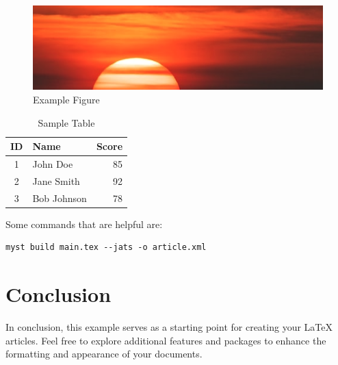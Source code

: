 \documentclass{article}
\begin{document}
\begin{figure}[h]
  \centering
  \includegraphics[width=0.8\linewidth]{image.png}
  \caption{Example Figure}
  \label{fig:example}
\end{figure}


\begin{table}[h]
  \centering
  \caption{Sample Table}
  \label{tab:sample}
  \begin{tabular}{|c|l|r|}
    \hline
    \textbf{ID} & \textbf{Name} & \textbf{Score} \\
    \hline
    1 & John Doe & 85 \\
    2 & Jane Smith & 92 \\
    3 & Bob Johnson & 78 \\
    \hline
  \end{tabular}
\end{table}

Some commands that are helpful are:

\begin{verbatim}
myst build main.tex --jats -o article.xml
\end{verbatim}

\section{Conclusion}
In conclusion, this example serves as a starting point for creating your LaTeX articles. Feel free to explore additional features and packages to enhance the formatting and appearance of your documents.



\end{document}
